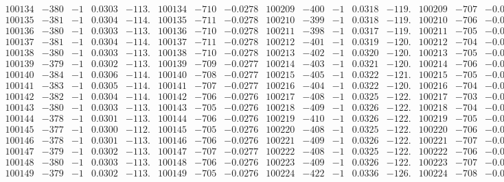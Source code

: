 \documentclass[11pt,reqno,a4letter]{article}
\numberwithin{figure}{section}
\numberwithin{table}{section}
\theoremstyle{plain}
\numberwithin{theorem}{section}
\theoremstyle{definition}
\begin{document}
\begin{table}[ht!]
\begin{equation*}
{\begin{array}{ccccc|ccc||ccccc|ccc}
100134 & -380 & -1 & 0.0303 & -113. & 100134 & -710 & -0.0278 & 100209 & -400 & -1 & 0.0318 & -119. & 100209 & -707 & -0.0276  \\
100135 & -381 & -1 & 0.0304 & -114. & 100135 & -711 & -0.0278 & 100210 & -399 & -1 & 0.0318 & -119. & 100210 & -706 & -0.0276  \\
100136 & -380 & -1 & 0.0303 & -113. & 100136 & -710 & -0.0278 & 100211 & -398 & -1 & 0.0317 & -119. & 100211 & -705 & -0.0276  \\
100137 & -381 & -1 & 0.0304 & -114. & 100137 & -711 & -0.0278 & 100212 & -401 & -1 & 0.0319 & -120. & 100212 & -704 & -0.0275  \\
100138 & -380 & -1 & 0.0303 & -113. & 100138 & -710 & -0.0278 & 100213 & -402 & -1 & 0.0320 & -120. & 100213 & -705 & -0.0276  \\
100139 & -379 & -1 & 0.0302 & -113. & 100139 & -709 & -0.0277 & 100214 & -403 & -1 & 0.0321 & -120. & 100214 & -706 & -0.0276  \\
100140 & -384 & -1 & 0.0306 & -114. & 100140 & -708 & -0.0277 & 100215 & -405 & -1 & 0.0322 & -121. & 100215 & -705 & -0.0276  \\
100141 & -383 & -1 & 0.0305 & -114. & 100141 & -707 & -0.0277 & 100216 & -404 & -1 & 0.0322 & -120. & 100216 & -704 & -0.0275  \\
100142 & -382 & -1 & 0.0304 & -114. & 100142 & -706 & -0.0276 & 100217 & -408 & -1 & 0.0325 & -122. & 100217 & -703 & -0.0275  \\
100143 & -380 & -1 & 0.0303 & -113. & 100143 & -705 & -0.0276 & 100218 & -409 & -1 & 0.0326 & -122. & 100218 & -704 & -0.0275  \\
100144 & -378 & -1 & 0.0301 & -113. & 100144 & -706 & -0.0276 & 100219 & -410 & -1 & 0.0326 & -122. & 100219 & -705 & -0.0276  \\
100145 & -377 & -1 & 0.0300 & -112. & 100145 & -705 & -0.0276 & 100220 & -408 & -1 & 0.0325 & -122. & 100220 & -706 & -0.0276  \\
100146 & -378 & -1 & 0.0301 & -113. & 100146 & -706 & -0.0276 & 100221 & -409 & -1 & 0.0326 & -122. & 100221 & -707 & -0.0276  \\
100147 & -379 & -1 & 0.0302 & -113. & 100147 & -707 & -0.0277 & 100222 & -408 & -1 & 0.0325 & -122. & 100222 & -706 & -0.0276  \\
100148 & -380 & -1 & 0.0303 & -113. & 100148 & -706 & -0.0276 & 100223 & -409 & -1 & 0.0326 & -122. & 100223 & -707 & -0.0276  \\
100149 & -379 & -1 & 0.0302 & -113. & 100149 & -705 & -0.0276 & 100224 & -422 & -1 & 0.0336 & -126. & 100224 & -708 & -0.0277  \\

\end{array}}
\end{equation*}
\end{table}
\end{document}
